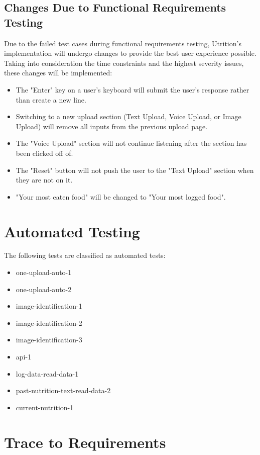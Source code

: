 \documentclass[12pt, titlepage]{article}
\begin{document}
	\subsection{Changes Due to Functional Requirements Testing}
	Due to the failed test cases during functional requirements testing, Utrition's implementation will undergo changes to provide the best user experience possible. Taking into consideration the time constraints and the highest severity issues, these changes will be implemented:
	\begin{itemize}
		\item The "Enter" key on a user's keyboard will submit the user's response rather than create a new line.
		\item Switching to a new upload section (Text Upload, Voice Upload, or Image Upload) will remove all inputs from the previous upload page. 
		\item The "Voice Upload" section will not continue listening after the section has been clicked off of.
		\item The "Reset" button will not push the user to the "Text Upload" section when they are not on it.
		\item "Your most eaten food" will be changed to "Your most logged food".
	\end{itemize}		

	\section{Automated Testing}

	The following tests are classified as automated tests:
    \begin{itemize}
        \item one-upload-auto-1
        \item one-upload-auto-2
        \item image-identification-1
        \item image-identification-2
        \item image-identification-3
        \item api-1
        \item log-data-read-data-1
        \item past-nutrition-text-read-data-2
        \item current-nutrition-1
    \end{itemize}
	
	\section{Trace to Requirements}
	
\end{document}
